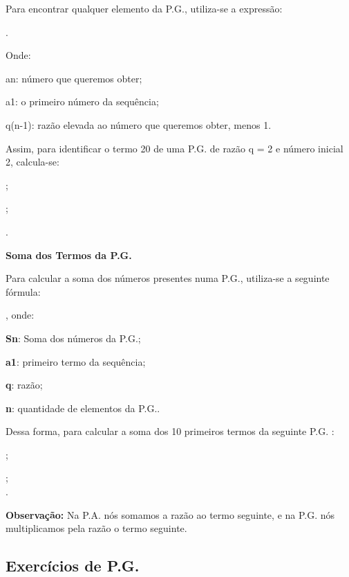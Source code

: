 \begin{multicols*}{2}
	Para encontrar qualquer elemento da P.G., utiliza-se a expressão:
	
	.
	
Onde:

an: número que queremos obter;

a1: o primeiro número da sequência;

q(n-1): razão elevada ao número que queremos obter, menos 1.

Assim, para identificar o termo 20 de uma P.G. de razão q = 2 e número inicial 2, calcula-se:


;

;

.

\textbf{Soma dos Termos da P.G.}

Para calcular a soma dos números presentes numa P.G., utiliza-se a seguinte fórmula:

, onde:

\textbf{Sn}: Soma dos números da P.G.;

\textbf{a1}: primeiro termo da sequência;

\textbf{q}: razão;

\textbf{n}: quantidade de elementos da P.G..

Dessa forma, para calcular a soma dos 10 primeiros termos da seguinte P.G. :

;

;\\

.

\textbf{Observação:} Na P.A. nós somamos a razão ao termo seguinte, e na P.G. nós multiplicamos pela razão o termo seguinte.

\subsection{Exercícios de P.G.}

\begin{enumerate}


\end{enumerate}
\end{multicols*}
